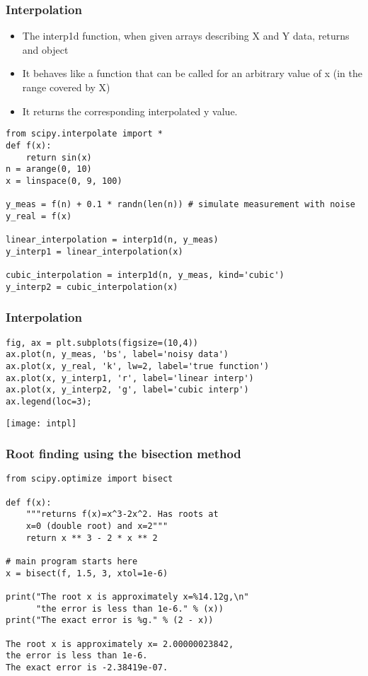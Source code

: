 \begin{frame}[fragile]\frametitle{Interpolation}
 \begin{itemize}
  \item  The interp1d function, when given arrays describing X and Y data, returns and object 
  \item It behaves like a function that can be called for an arbitrary value of x (in the range covered by X)
  \item It returns the corresponding interpolated y value.
   \end{itemize}
\begin{lstlisting}
from scipy.interpolate import *
def f(x):
    return sin(x)
n = arange(0, 10)  
x = linspace(0, 9, 100)

y_meas = f(n) + 0.1 * randn(len(n)) # simulate measurement with noise
y_real = f(x)

linear_interpolation = interp1d(n, y_meas)
y_interp1 = linear_interpolation(x)

cubic_interpolation = interp1d(n, y_meas, kind='cubic')
y_interp2 = cubic_interpolation(x)    
\end{lstlisting}
\end{frame}


\begin{frame}[fragile]\frametitle{Interpolation}
\begin{lstlisting}
fig, ax = plt.subplots(figsize=(10,4))
ax.plot(n, y_meas, 'bs', label='noisy data')
ax.plot(x, y_real, 'k', lw=2, label='true function')
ax.plot(x, y_interp1, 'r', label='linear interp')
ax.plot(x, y_interp2, 'g', label='cubic interp')
ax.legend(loc=3);
\end{lstlisting}
\begin{center}
\texttt{[image: intpl]}
\end{center}
\end{frame}

\begin{frame}[fragile]\frametitle{Root finding using the bisection method}
\begin{lstlisting}
from scipy.optimize import bisect

def f(x):
    """returns f(x)=x^3-2x^2. Has roots at
    x=0 (double root) and x=2"""
    return x ** 3 - 2 * x ** 2

# main program starts here
x = bisect(f, 1.5, 3, xtol=1e-6)

print("The root x is approximately x=%14.12g,\n"
      "the error is less than 1e-6." % (x))
print("The exact error is %g." % (2 - x))

The root x is approximately x= 2.00000023842,
the error is less than 1e-6.
The exact error is -2.38419e-07.
\end{lstlisting}
\end{frame}


